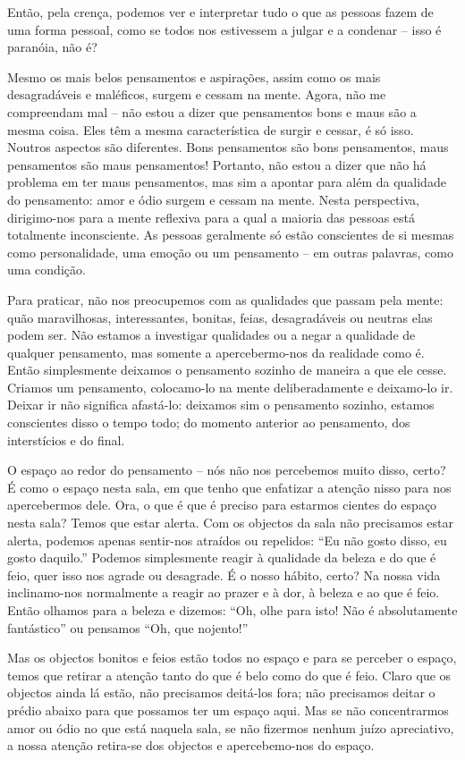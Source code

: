 Então, pela crença, podemos ver e interpretar tudo o que as pessoas fazem de uma
forma pessoal, como se todos nos estivessem a julgar e a condenar -- isso é
paranóia, não é?

Mesmo os mais belos pensamentos e aspirações, assim como os mais desagradáveis e
maléficos, surgem e cessam na mente. Agora, não me compreendam mal -- não estou
a dizer que pensamentos bons e maus são a mesma coisa. Eles têm a mesma
característica de surgir e cessar, é só isso. Noutros aspectos são diferentes.
Bons pensamentos são bons pensamentos, maus pensamentos são maus pensamentos!
Portanto, não estou a dizer que não há problema em ter maus pensamentos, mas sim
a apontar para além da qualidade do pensamento: amor e ódio surgem e cessam na
mente. Nesta perspectiva, dirigimo-nos para a mente reflexiva para a qual a
maioria das pessoas está totalmente inconsciente. As pessoas geralmente só estão
conscientes de si mesmas como personalidade, uma emoção ou um pensamento -- em
outras palavras, como uma condição.

Para praticar, não nos preocupemos com as qualidades que passam pela mente: quão
maravilhosas, interessantes, bonitas, feias, desagradáveis ou neutras elas podem
ser. Não estamos a investigar qualidades ou a negar a qualidade de qualquer
pensamento, mas somente a apercebermo-nos da realidade como é. Então
simplesmente deixamos o pensamento sozinho de maneira a que ele cesse. Criamos
um pensamento, colocamo-lo na mente deliberadamente e deixamo-lo ir. Deixar ir
não significa afastá-lo: deixamos sim o pensamento sozinho, estamos conscientes
disso o tempo todo; do momento anterior ao pensamento, dos interstícios e do
final.

O espaço ao redor do pensamento -- nós não nos percebemos muito disso, certo? É
como o espaço nesta sala, em que tenho que enfatizar a atenção nisso para nos
apercebermos dele. Ora, o que é que é preciso para estarmos cientes do espaço
nesta sala? Temos que estar alerta. Com os objectos da sala não precisamos estar
alerta, podemos apenas sentir-nos atraídos ou repelidos: ``Eu não gosto disso,
eu gosto daquilo.'' Podemos simplesmente reagir à qualidade da beleza e do que é
feio, quer isso nos agrade ou desagrade. É o nosso hábito, certo? Na nossa vida
inclinamo-nos normalmente a reagir ao prazer e à dor, à beleza e ao que é feio.
Então olhamos para a beleza e dizemos: ``Oh, olhe para isto! Não é absolutamente
fantástico'' ou pensamos ``Oh, que nojento!''

Mas os objectos bonitos e feios estão todos no espaço e para se perceber o
espaço, temos que retirar a atenção tanto do que é belo como do que é feio.
Claro que os objectos ainda lá estão, não precisamos deitá-los fora; não
precisamos deitar o prédio abaixo para que possamos ter um espaço aqui. Mas se
não concentrarmos amor ou ódio no que está naquela sala, se não fizermos nenhum
juízo apreciativo, a nossa atenção retira-se dos objectos e apercebemo-nos do
espaço.

